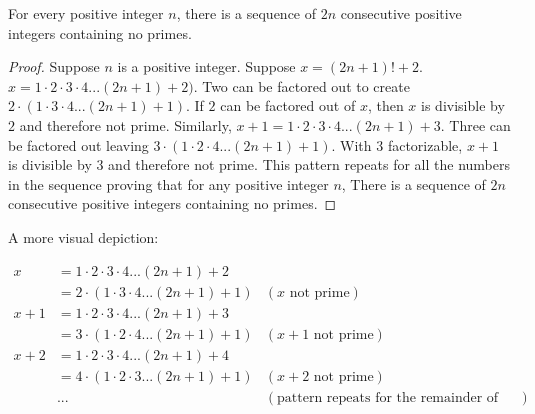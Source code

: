 
\begin{theorem}
  For every positive integer $n$, there is a sequence of $2n$ consecutive
  positive integers containing no primes.
\end{theorem}

\begin{proof}
  Suppose $n$ is a positive integer. Suppose $x=(2n+1)!+2$. $x= 1 \cdot 2 \cdot
  3 \cdot 4 ...(2n+1) + 2)$. Two can be factored out to create $2 \cdot (1 \cdot
  3 \cdot 4 . . . (2n+1) + 1)$. If $2$ can be factored out of $x$, then $x$ is
  divisible by $2$ and therefore not prime. Similarly, $x+1=1 \cdot 2 \cdot 3
  \cdot 4 ...(2n+1)+3$. Three can be factored out leaving $3 \cdot (1 \cdot 2
  \cdot 4 . . . (2n+1) +1)$. With $3$ factorizable, $x+1$ is divisible by $3$ and
  therefore not prime. This pattern repeats for all the numbers in the sequence
  proving that for any positive integer $n$, There is a sequence of $2n$
  consecutive positive integers containing no primes.
\end{proof}

A more visual depiction:

\begin{align*}
      x &= 1 \cdot 2 \cdot 3 \cdot 4 . . . (2n+1) + 2\\
        &= 2 \cdot (1 \cdot 3 \cdot 4 . . . (2n+1) + 1) &(\textrm{$x$ not prime})\\
  x + 1 &= 1 \cdot 2 \cdot 3 \cdot 4 . . . (2n+1) +3\\
        &= 3 \cdot (1 \cdot 2 \cdot 4 . . . (2n+1) +1) &(\textrm{$x+1$ not prime})\\
  x + 2 &= 1 \cdot 2 \cdot 3 \cdot 4 . . . (2n+1) +4\\
        &= 4 \cdot (1 \cdot 2 \cdot 3 . . . (2n+1) +1) &(\textrm{$x+2$ not prime})\\
        &... &(\textrm{pattern repeats for the remainder of the sequence})
\end{align*}
